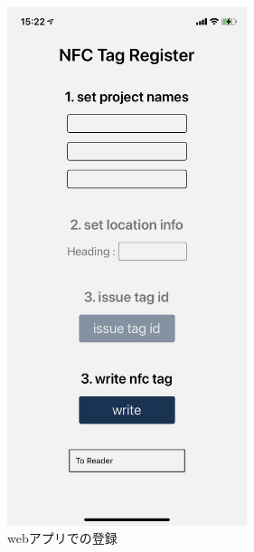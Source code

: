 \begin{figure}[htbp]
\begin{minipage}{0.5\hsize}
    \includegraphics[width=70mm]{images/nfc_register_mobile.png}
    \caption{webアプリでの登録} \label{fig:nfc_register_web}
  \end{minipage}
\end{figure}